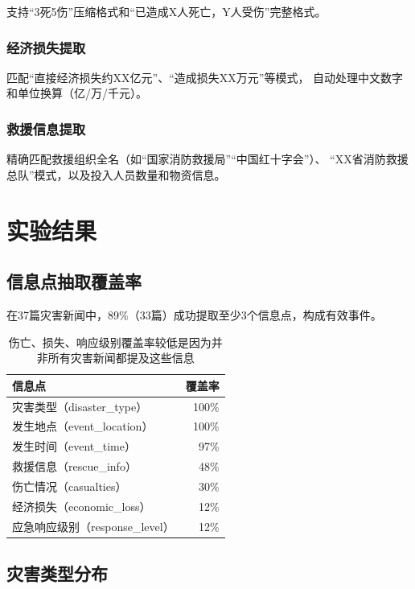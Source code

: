 \documentclass[12pt,a4paper]{ctexart}
\begin{document}
支持``3死5伤''压缩格式和``已造成X人死亡，Y人受伤''完整格式。

\subsubsection*{经济损失提取}

匹配``直接经济损失约XX亿元''、``造成损失XX万元''等模式，
自动处理中文数字和单位换算（亿/万/千元）。

\subsubsection*{救援信息提取}

精确匹配救援组织全名（如``国家消防救援局''``中国红十字会''）、
``XX省消防救援总队''模式，以及投入人员数量和物资信息。

\section{实验结果}

\subsection{信息点抽取覆盖率}

在37篇灾害新闻中，89\%（33篇）成功提取至少3个信息点，构成有效事件。

\begin{table}[h]
\centering
\caption{各信息点抽取覆盖率（33个有效事件）}
\begin{tabular}{lr}
\toprule
信息点 & 覆盖率 \\
\midrule
灾害类型（disaster\_type） & 100\% \\
发生地点（event\_location） & 100\% \\
发生时间（event\_time） & 97\% \\
救援信息（rescue\_info） & 48\% \\
伤亡情况（casualties） & 30\% \\
经济损失（economic\_loss） & 12\% \\
应急响应级别（response\_level） & 12\% \\
\bottomrule
\end{tabular}
\caption*{伤亡、损失、响应级别覆盖率较低是因为并非所有灾害新闻都提及这些信息}
\end{table}

\subsection{灾害类型分布}
\end{document}
